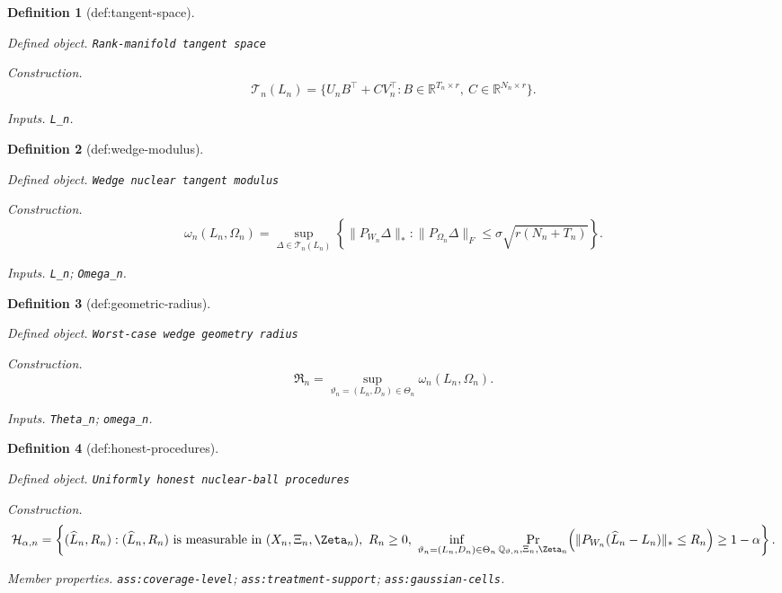 \documentclass{article}
\newtheorem{definition}{Definition}
\begin{document}
\begin{definition}[def:tangent-space]\label{def:tangent-space}
\par\smallskip\noindent\emph{Defined object.} \texttt{Rank-\allowbreak{}manifold tangent space}
\par\smallskip\noindent\emph{Construction.} \[\mathcal T_n(L_n)=\{U_nB^{\top}+CV_n^{\top}:B\in\mathbb R^{T_n\times r},\ C\in\mathbb R^{N_n\times r}\}.\]
\par\smallskip\noindent\emph{Inputs.} \texttt{L\_\allowbreak{}n}.
\end{definition}

\begin{definition}[def:wedge-modulus]\label{def:wedge-modulus}
\par\smallskip\noindent\emph{Defined object.} \texttt{Wedge nuclear tangent modulus}
\par\smallskip\noindent\emph{Construction.} \[\omega_n(L_n,\Omega_n)=\sup_{\Delta\in\mathcal T_n(L_n)}\left\{\lVert P_{W_n}\Delta\rVert_*:\lVert P_{\Omega_n}\Delta\rVert_F\le\sigma\sqrt{r(N_n+T_n)}\right\}.\]
\par\smallskip\noindent\emph{Inputs.} \texttt{L\_\allowbreak{}n}; \texttt{Omega\_\allowbreak{}n}.
\end{definition}

\begin{definition}[def:geometric-radius]\label{def:geometric-radius}
\par\smallskip\noindent\emph{Defined object.} \texttt{Worst-\allowbreak{}case wedge geometry radius}
\par\smallskip\noindent\emph{Construction.} \[\mathfrak R_n=\sup_{\vartheta_n=(L_n,D_n)\in\Theta_n}\omega_n(L_n,\Omega_n).\]
\par\smallskip\noindent\emph{Inputs.} \texttt{Theta\_\allowbreak{}n}; \texttt{omega\_\allowbreak{}n}.
\end{definition}

\begin{definition}[def:honest-procedures]\label{def:honest-procedures}
\par\smallskip\noindent\emph{Defined object.} \texttt{Uniformly honest nuclear-\allowbreak{}ball procedures}
\par\smallskip\noindent\emph{Construction.} \[\mathcal H_{\alpha,n}=\left\{(\widehat L_n,R_n):(\widehat L_n,R_n)\text{ is measurable in }(X_n,\Xi_n,\Zeta_n),\ R_n\ge0,\ \inf_{\vartheta_n=(L_n,D_n)\in\Theta_n}\Pr_{\mathbb Q_{\vartheta,n},\Xi_n,\Zeta_n}\!\left(\lVert P_{W_n}(\widehat L_n-L_n)\rVert_*\le R_n\right)\ge1-\alpha\right\}.\]
\par\smallskip\noindent\emph{Member properties.} \texttt{ass:\allowbreak{}coverage-\allowbreak{}level}; \texttt{ass:\allowbreak{}treatment-\allowbreak{}support}; \texttt{ass:\allowbreak{}gaussian-\allowbreak{}cells}.
\end{definition}
\end{document}

